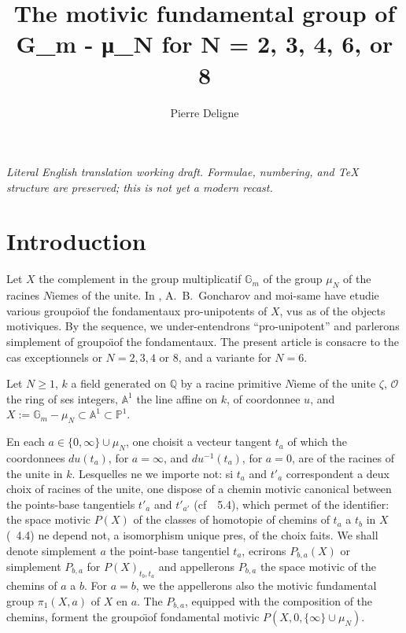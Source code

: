\documentclass[11pt,a4paper]{article}
\title{The motivic fundamental group of G_m - μ_N for N = 2, 3, 4, 6, or 8}
\author{Pierre Deligne}
\date{}
\theoremstyle{plain}
\theoremstyle{definition}
\newcommand{\Gm}{\mathbb{G}_m}
\newcommand{\Q}{\mathbb{Q}}
\newcommand{\A}{\mathbb{A}}
\newcommand{\Pone}{\mathbb{P}^1}
\begin{document}
\begin{center}\small\emph{Literal English translation working draft. Formulae, numbering, and TeX structure are preserved; this is not yet a modern recast.}\end{center}
\vspace{0.5em}


\maketitle

\tableofcontents

\section{Introduction}
\label{sec:0}

Let $X$ the complement in the group multiplicatif $\Gm$ of the group $\mu_N$ of the racines $N$iemes of the unite. In \cite{1}, A.~B.~Goncharov and moi-same have etudie various groupo\"{\i}of the fondamentaux pro-unipotents of $X$, vus as of the objects motiviques. By the sequence, we under-entendrons ``pro-unipotent'' and parlerons simplement of groupo\"{\i}of the fondamentaux. The present article is consacre to the cas exceptionnels or $N = 2,3,4$ or $8$, and a variante for $N=6$.

Let $N \geq 1$, $k$ a field generated on $\Q$ by a racine primitive $N$ieme of the unite $\zeta$, $\mathcal{O}$ the ring of ses integers, $\A^1$ the line affine on $k$, of coordonnee $u$, and $X := \Gm - \mu_N \subset \A^1 \subset \Pone$.

En each $a \in \{0, \infty\} \cup \mu_N$, one choisit a vecteur tangent $t_a$ of which the coordonnees $du(t_a)$, for $a=\infty$, and $du^{-1}(t_a)$, for $a=0$, are of the racines of the unite in $k$. Lesquelles ne we importe not: si $t_a$ and $t'_a$ correspondent a deux choix of racines of the unite, one dispose of a chemin motivic canonical between the points-base tangentiels $t'_a$ and $t'_{a'}$ (cf~\cite{1}~5.4), which permet of the identifier: the space motivic $P(X)$ of the classes of homotopie of chemins of $t_a$ a $t_b$ in $X$ (\cite{1}~4.4) ne depend not, a isomorphism unique pres, of the choix faits. We shall denote simplement $a$ the point-base tangentiel $t_a$, ecrirons $P_{b,a}(X)$ or simplement $P_{b,a}$ for $P(X)_{t_b,t_a}$ and appellerons $P_{b,a}$ the space motivic of the chemins of $a$ a $b$. For $a=b$, we the appellerons also the motivic fundamental group $\pi_1(X,a)$ of $X$ en $a$. The $P_{b,a}$, equipped with the composition of the chemins, forment the groupo\"{\i}of fondamental motivic $P(X,0,\{\infty\} \cup \mu_N)$.
\end{document}
